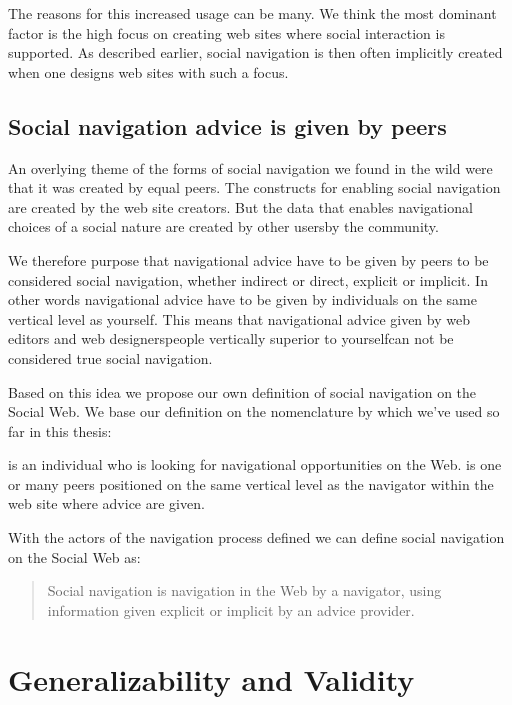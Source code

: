 The reasons for this increased usage can be many. We think the most dominant
factor is the high focus on creating web sites where social interaction is
supported. As described earlier, social navigation is then often
implicitly created when one designs web sites with such a focus.

\subsection{Social navigation advice is given by peers}
\label{section:flickr.facebook.discussion.peers}

An overlying theme of the forms of social navigation we found in the wild were
that it was created by equal peers. The constructs for enabling social
navigation are created by the web site creators. But the data that
enables navigational choices of a social nature are created by other
users\dash{}by the community.

We therefore purpose that navigational advice have to
be given by peers to be considered social navigation,
whether indirect or direct, explicit or implicit.
In other words
navigational advice have to be given by individuals on the same vertical
level as yourself. This means that navigational advice given by web editors
and web designers\dash{}people vertically superior to yourself\dash{}can not
be considered true social navigation.

Based on this idea we propose our own definition of social navigation on the
Social Web. We base our definition on the nomenclature by
\citet[]{svensson03} which we've used so far in this thesis:

\begin{items}
   is an individual who is looking for navigational
    opportunities on the Web.
   is one or many peers positioned on the same
    vertical level as the navigator within the web site where advice are
    given.
\end{items}

With the actors of the navigation process defined we can define social
navigation on the Social Web as:

\begin{quote}
  Social navigation is navigation in the Web by a navigator, using
  information given explicit or implicit by an advice provider.
\end{quote}

\section{Generalizability and Validity}

